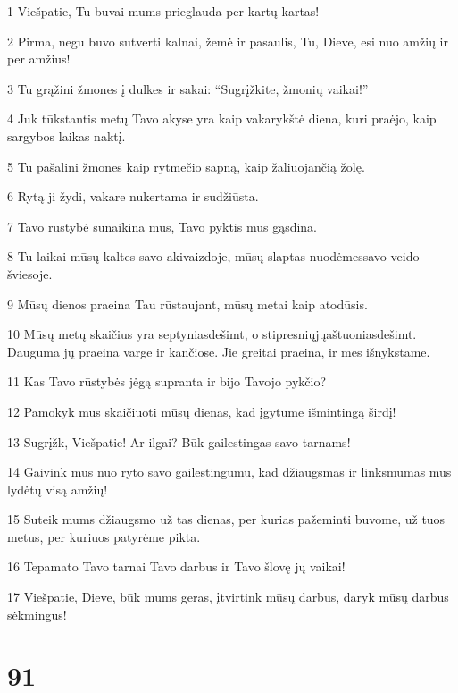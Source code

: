 \par 1 Viešpatie, Tu buvai mums prieglauda per kartų kartas! 
\par 2 Pirma, negu buvo sutverti kalnai, žemė ir pasaulis, Tu, Dieve, esi nuo amžių ir per amžius! 
\par 3 Tu grąžini žmones į dulkes ir sakai: “Sugrįžkite, žmonių vaikai!” 
\par 4 Juk tūkstantis metų Tavo akyse yra kaip vakarykštė diena, kuri praėjo, kaip sargybos laikas naktį. 
\par 5 Tu pašalini žmones kaip rytmečio sapną, kaip žaliuojančią žolę. 
\par 6 Rytą ji žydi, vakare nukertama ir sudžiūsta. 
\par 7 Tavo rūstybė sunaikina mus, Tavo pyktis mus gąsdina. 
\par 8 Tu laikai mūsų kaltes savo akivaizdoje, mūsų slaptas nuodėmes­savo veido šviesoje. 
\par 9 Mūsų dienos praeina Tau rūstaujant, mūsų metai kaip atodūsis. 
\par 10 Mūsų metų skaičius yra septyniasdešimt, o stipresniųjų­aštuoniasdešimt. Dauguma jų praeina varge ir kančiose. Jie greitai praeina, ir mes išnykstame. 
\par 11 Kas Tavo rūstybės jėgą supranta ir bijo Tavojo pykčio? 
\par 12 Pamokyk mus skaičiuoti mūsų dienas, kad įgytume išmintingą širdį! 
\par 13 Sugrįžk, Viešpatie! Ar ilgai? Būk gailestingas savo tarnams! 
\par 14 Gaivink mus nuo ryto savo gailestingumu, kad džiaugsmas ir linksmumas mus lydėtų visą amžių! 
\par 15 Suteik mums džiaugsmo už tas dienas, per kurias pažeminti buvome, už tuos metus, per kuriuos patyrėme pikta. 
\par 16 Tepamato Tavo tarnai Tavo darbus ir Tavo šlovę jų vaikai! 
\par 17 Viešpatie, Dieve, būk mums geras, įtvirtink mūsų darbus, daryk mūsų darbus sėkmingus!


\chapter{91}


